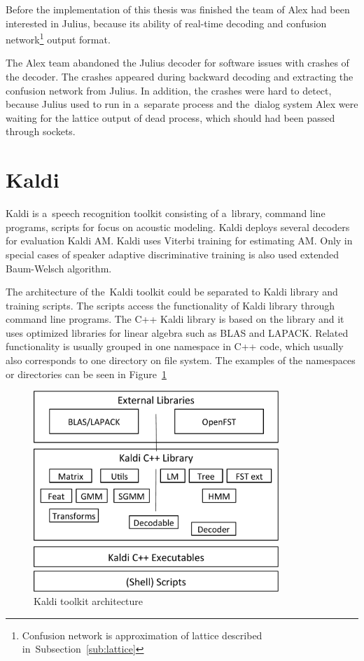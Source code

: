 {Before the implementation of this thesis was finished 
the team of Alex had been interested in Julius, because its ability of real-time decoding 
and confusion 
network\footnote{Confusion network is approximation of lattice described in~Subsection~\ref{sub:lattice}} 
output format.

The Alex team abandoned the Julius decoder for software issues with crashes of the decoder. 
The crashes appeared during backward decoding and extracting
the confusion network from Julius. 
In addition, the crashes were hard to detect,
because Julius used to run in a~separate process and 
the~dialog system Alex were waiting for the lattice output of dead process,
which should had been passed through sockets.

\section{Kaldi}
\label{sec:back_kaldi}

Kaldi is a~speech recognition toolkit consisting of a~library, command line programs, scripts for focus on acoustic modeling.
Kaldi deploys several decoders for evaluation Kaldi \ac{AM}.
Kaldi uses Viterbi training for estimating \ac{AM}. 
Only in special cases of speaker adaptive discriminative training is also used extended Baum-Welsch algorithm\cite{povey2011kaldi}.

The architecture of the~Kaldi toolkit could be separated to Kaldi library and training scripts.
The scripts access the functionality of Kaldi library through command line programs.
The C++ Kaldi library is based on the \cite{allauzen2007openfst} library and 
it uses optimized libraries for linear algebra such as BLAS and LAPACK.
Related functionality is usually grouped in one namespace in C++ code, which usually also corresponds
to one directory on file system. The examples of the namespaces or directories can be seen in Figure~\ref{fig:kaldi_arch}

\begin{figure}[!htp]
    \begin{center}
        \includegraphics[width=25em]{images/kaldi-lib}
        \caption{Kaldi toolkit architecture\cite{povey2011kaldi}}
        \label{fig:kaldi_arch} 
    \end{center}
\end{figure}

}
